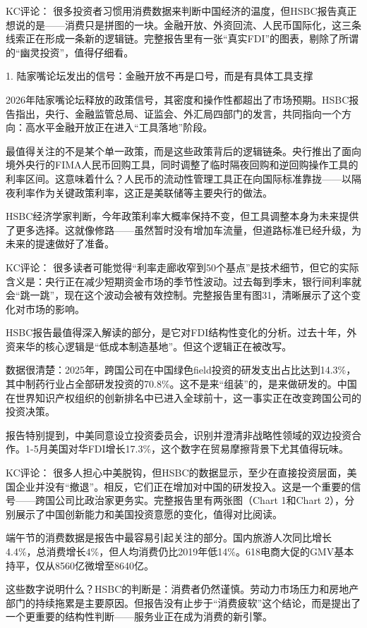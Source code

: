 \documentclass[11pt]{ctexart}
\begin{document}
KC评论： 很多投资者习惯用消费数据来判断中国经济的温度，但HSBC报告真正想说的是——消费只是拼图的一块。金融开放、外资回流、人民币国际化，这三条线索正在形成一条新的逻辑链。完整报告里有一张“真实FDI”的图表，剔除了所谓的“幽灵投资”，值得仔细看。

1. 陆家嘴论坛发出的信号：金融开放不再是口号，而是有具体工具支撑

2026年陆家嘴论坛释放的政策信号，其密度和操作性都超出了市场预期。HSBC报告指出，央行、金融监管总局、证监会、外汇局四部门的发言，共同指向一个方向：高水平金融开放正在进入“工具落地”阶段。

最值得关注的不是某个单一政策，而是这些政策背后的逻辑链条。央行推出了面向境外央行的FIMA人民币回购工具，同时调整了临时隔夜回购和逆回购操作工具的利率区间。这意味着什么？人民币的流动性管理工具正在向国际标准靠拢——以隔夜利率作为关键政策利率，这正是美联储等主要央行的做法。

HSBC经济学家判断，今年政策利率大概率保持不变，但工具调整本身为未来提供了更多选择。这就像修路——虽然暂时没有增加车流量，但道路标准已经升级，为未来的提速做好了准备。

KC评论： 很多读者可能觉得“利率走廊收窄到50个基点”是技术细节，但它的实际含义是：央行正在减少短期资金市场的季节性波动。过去每到季末，银行间利率就会“跳一跳”，现在这个波动会被有效控制。完整报告里有图31，清晰展示了这个变化对市场的影响。

HSBC报告最值得深入解读的部分，是它对FDI结构性变化的分析。过去十年，外资来华的核心逻辑是“低成本制造基地”。但这个逻辑正在被改写。

数据很清楚：2025年，跨国公司在中国绿色field投资的研发支出占比达到14.3\%，其中制药行业占全部研发投资的70.8\%。这不是来“组装”的，是来做研发的。中国在世界知识产权组织的创新排名中已进入全球前十，这一事实正在改变跨国公司的投资决策。

报告特别提到，中美同意设立投资委员会，识别并澄清非战略性领域的双边投资合作。1-5月美国对华FDI增长17.3\%，这个数字在贸易摩擦背景下尤其值得玩味。

KC评论： 很多人担心中美脱钩，但HSBC的数据显示，至少在直接投资层面，美国企业并没有“撤退”。相反，它们正在增加对中国的研发投入。这是一个重要的信号——跨国公司比政治家更务实。完整报告里有两张图（Chart 1和Chart 2），分别展示了中国创新能力和美国投资意愿的变化，值得对比阅读。

端午节的消费数据是报告中最容易引起关注的部分。国内旅游人次同比增长4.4\%，总消费增长4\%，但人均消费仍比2019年低14\%。618电商大促的GMV基本持平，仅从8560亿微增至8640亿。

这些数字说明什么？HSBC的判断是：消费者仍然谨慎。劳动力市场压力和房地产部门的持续拖累是主要原因。但报告没有止步于“消费疲软”这个结论，而是提出了一个更重要的结构性判断——服务业正在成为消费的新引擎。
\end{document}
